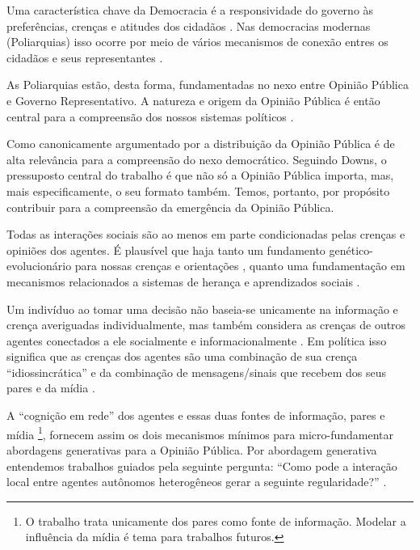 Uma característica chave da Democracia é a responsividade do governo às
preferências, crenças e atitudes dos cidadãos
\cite{dahl1973polyarchy,bartels2003democracy}. Nas democracias modernas
(Poliarquias) isso ocorre por meio de vários mecanismos de conexão entres os
cidadãos e seus representantes \cite{dahl1989democracy,
  schumpeter2013capitalism}.

As Poliarquias estão, desta forma, fundamentadas no nexo entre Opinião Pública e
Governo Representativo. A natureza e origem da Opinião Pública é então
central para a compreensão dos nossos sistemas políticos
\cite{berelson1952democratic}.

Como canonicamente argumentado por  a distribuição
da Opinião Pública é de alta relevância para a compreensão do nexo democrático.
Seguindo Downs, o pressuposto central do trabalho é que não só a Opinião Pública
importa, mas, mais especificamente, o seu formato também. Temos, portanto, por
propósito contribuir para a compreensão da emergência da Opinião
Pública.

Todas as interações sociais são ao menos em parte condicionadas pelas crenças e
opiniões dos agentes. É plausível que haja tanto um fundamento
genético-evolucionário para nossas crenças e orientações , quanto uma
fundamentação em mecanismos relacionados a sistemas de herança e aprendizados
sociais \cite{jablonka2014evolution, fowler2008biology, fowler2013defense}.

Um indivíduo ao tomar uma decisão não baseia-se unicamente na informação e
crença averiguadas individualmente, mas também considera as crenças de outros
agentes conectados a ele socialmente e informacionalmente
\cite{gintis2016individuality}. Em política isso significa que as crenças dos
agentes são uma combinação de sua crença ``idiossincrática'' e da combinação de
mensagens/sinais que recebem dos seus pares e da mídia
\cite{barabas2004deliberation,ryan2011social}.

A ``cognição em rede'' \cite{gintis2016individuality} dos agentes e essas duas
fontes de informação, pares e mídia \footnote{O trabalho trata unicamente dos
  pares como fonte de informação. Modelar a influência da mídia é tema para
  trabalhos futuros.}, fornecem assim os dois mecanismos mínimos para
micro-fundamentar abordagens generativas para a Opinião Pública. Por abordagem
generativa entendemos trabalhos guiados pela seguinte pergunta: ``Como pode a
interação local entre agentes autônomos heterogêneos gerar a seguinte
regularidade?'' \cite{epstein2006generative}.

